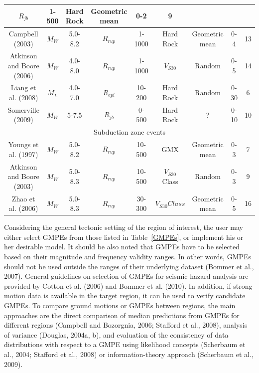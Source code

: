 \begin{landscape}
\begin{table}[!t]
\begin{tabular}{|c|c|c|c|c|c|c|c|c|}
$R_{jb}$& 1-500& Hard Rock & Geometric mean & 0-2 & 9\\
\hline {\footnotesize Campbell (2003)} & $M_W$ & 5.0-8.2 &
$R_{rup}$& 1-1000& Hard Rock & Geometric mean & 0-4 & 13\\
\hline {\footnotesize Atkinson and Boore (2006)} & $M_W$ & 4.0-8.0 &
$R_{rup}$& 1-1000& $V_{S30}$ & Random & 0-5 & 14 \\
\hline {\footnotesize Liang et al. (2008)} & $M_L$ & 4.0-7.0 &
$R_{epi}$& 10-200& Hard Rock & Random & 0-30 & 6\\
\hline {\footnotesize Somerville (2009)} & $M_W$ &5-7.5  &
$R_{jb}$& 0-500& Hard Rock &  ?& 0-10 & 10\\

\hline \multicolumn{9}{|c|}{Subduction zone events}\\
\hline {\footnotesize Youngs et al. (1997)} & $M_W$ & 5.0-8.2 &
$R_{rup}$& 10-500& GMX & Geometric mean & 0-3 & 7\\
\hline {\footnotesize Atkinson and Boore (2003)} & $M_W$ & 5.0-8.3 &
$R_{rup}$& 10-500& $V_{S30}$ Class & Random & 0-3 & 9\\
\hline {\footnotesize Zhao et al. (2006)} & $M_W$ & 5.0-8.3 &
$R_{rup}$ &
30-300& $V_{S30} Class$ & Geometric mean & 0-5 & 16\\
\hline

\end{tabular}
\end{table}
\end{landscape}

Considering the general tectonic setting of the region of interest,
the user may either select GMPEs from those listed in
Table~\ref{GMPEs}, or implement his or her desirable model. It
should be also noted that GMPEs have to be selected based on their
magnitude and frequency validity ranges. In other words, GMPEs
should not be used outside the ranges of their underlying dataset
(Bommer et al., 2007). General guidelines on selection of GMPEs for
seismic hazard analysis are provided by Cotton et al. (2006) and
Bommer et al. (2010). In addition, if strong motion data is
available in the target region, it can be used to verify candidate
GMPEs. To compare ground motions or GMPEs between regions, the main
approaches are the direct comparison of median predictions from
GMPEs for different regions (Campbell and Bozorgnia, 2006; Stafford
et al., 2008), analysis of variance (Douglas, 2004a, b), and
evaluation of the consistency of data distributions with respect to
a GMPE using likelihood concepts (Scherbaum et al., 2004; Stafford
et al., 2008) or information-theory approach (Scherbaum et al.,
2009).

